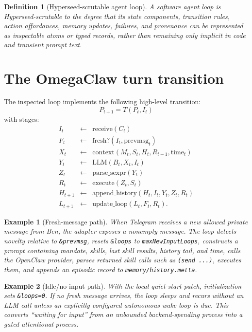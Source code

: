 \documentclass[11pt]{article}
\newtheorem{definition}{Definition}
\newtheorem{example}{Example}
\begin{document}
\begin{definition}[Hyperseed-scrutable agent loop]
A software agent loop is \emph{Hyperseed-scrutable} to the degree that its state
components, transition rules, action affordances, memory updates, failures, and
provenance can be represented as inspectable atoms or typed records, rather than
remaining only implicit in code and transient prompt text.
\end{definition}

\section{The OmegaClaw turn transition}

The inspected loop implements the following high-level transition:
\[
  P_{t+1}=T(P_t, I_t)
\]
with stages:
\[
\begin{array}{rcl}
  I_t &\leftarrow& \mathrm{receive}(C_t) \\
  F_t &\leftarrow& \mathrm{fresh?}(I_t,\mathrm{prevmsg}_t) \\
  X_t &\leftarrow& \mathrm{context}(M_t,S_t,H_t,R_{t-1},\mathrm{time}_t) \\
  Y_t &\leftarrow& \mathrm{LLM}(B_t, X_t, I_t) \\
  Z_t &\leftarrow& \mathrm{parse\_sexpr}(Y_t) \\
  R_t &\leftarrow& \mathrm{execute}(Z_t,S_t) \\
  H_{t+1} &\leftarrow& \mathrm{append\_history}(H_t,I_t,Y_t,Z_t,R_t) \\
  L_{t+1} &\leftarrow& \mathrm{update\_loop}(L_t,F_t,R_t).
\end{array}
\]

\begin{example}[Fresh-message path]
When Telegram receives a new allowed private message from Ben, the adapter exposes a
nonempty message.  The loop detects novelty relative to \texttt{\&prevmsg}, resets
\texttt{\&loops} to \texttt{maxNewInputLoops}, constructs a prompt containing mandate,
skills, last skill results, history tail, and time, calls the OpenClaw provider,
parses returned skill calls such as \texttt{(send ...)}, executes them, and appends
an episodic record to \texttt{memory/history.metta}.
\end{example}

\begin{example}[Idle/no-input path]
With the local quiet-start patch, initialization sets \texttt{\&loops=0}.  If no fresh
message arrives, the loop sleeps and recurs without an LLM call unless an explicitly
configured autonomous wake loop is due.  This converts ``waiting for input'' from an
unbounded backend-spending process into a gated attentional process.
\end{example}
\end{document}
